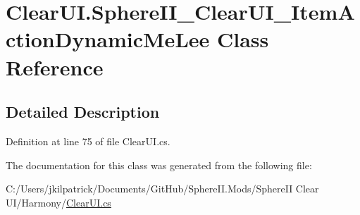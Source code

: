 \hypertarget{class_clear_u_i_1_1_sphere_i_i___clear_u_i___item_action_dynamic_me_lee}{}\section{Clear\+U\+I.\+Sphere\+I\+I\+\_\+\+Clear\+U\+I\+\_\+\+Item\+Action\+Dynamic\+Me\+Lee Class Reference}
\label{class_clear_u_i_1_1_sphere_i_i___clear_u_i___item_action_dynamic_me_lee}


\subsection{Detailed Description}


Definition at line 75 of file Clear\+U\+I.\+cs.



The documentation for this class was generated from the following file\+:\begin{DoxyCompactItemize}
\item 
C\+:/\+Users/jkilpatrick/\+Documents/\+Git\+Hub/\+Sphere\+I\+I.\+Mods/\+Sphere\+I\+I Clear U\+I/\+Harmony/\mbox{\hyperlink{_clear_u_i_8cs}{Clear\+U\+I.\+cs}}\end{DoxyCompactItemize}
